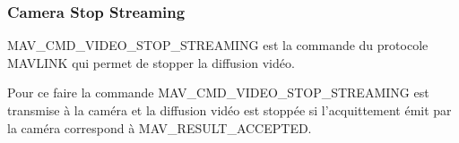 \subsubsection{Camera Stop Streaming}
MAV\_CMD\_VIDEO\_STOP\_STREAMING est la commande du protocole MAVLINK qui permet de stopper la diffusion vidéo.

Pour ce faire la commande MAV\_CMD\_VIDEO\_STOP\_STREAMING est transmise à la caméra et la diffusion vidéo est stoppée si l'acquittement émit par la caméra correspond à MAV\_RESULT\_ACCEPTED.